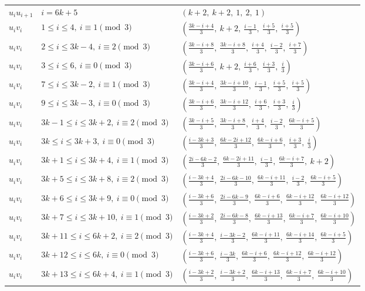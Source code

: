 \begin{longtable}{lll}
$u_i u_{i+1}$ & $i = 6k+5$ & $(k+2,\ k+2,\ 1,\ 2,\ 1)$ \\
$u_i v_i$ & $1 \le i \le 4,\ i \equiv 1 \pmod{3}$ & $(\frac{3k-i+4}{3},\ k+2,\ \frac{i-1}{3},\ \frac{i+5}{3},\ \frac{i+5}{3})$ \\
$u_i v_i$ & $2 \le i \le 3k-4,\ i \equiv 2 \pmod{3}$ & $(\frac{3k-i+8}{3},\ \frac{3k-i+8}{3},\ \frac{i+4}{3},\ \frac{i-2}{3},\ \frac{i+7}{3})$ \\
$u_i v_i$ & $3 \le i \le 6,\ i \equiv 0 \pmod{3}$ & $(\frac{3k-i+6}{3},\ k+2,\ \frac{i+6}{3},\ \frac{i+3}{3},\ \frac{i}{3})$ \\
$u_i v_i$ & $7 \le i \le 3k-2,\ i \equiv 1 \pmod{3}$ & $(\frac{3k-i+4}{3},\ \frac{3k-i+10}{3},\ \frac{i-1}{3},\ \frac{i+5}{3},\ \frac{i+5}{3})$ \\
$u_i v_i$ & $9 \le i \le 3k-3,\ i \equiv 0 \pmod{3}$ & $(\frac{3k-i+6}{3},\ \frac{3k-i+12}{3},\ \frac{i+6}{3},\ \frac{i+3}{3},\ \frac{i}{3})$ \\
$u_i v_i$ & $3k-1 \le i \le 3k+2,\ i \equiv 2 \pmod{3}$ & $(\frac{3k-i+5}{3},\ \frac{3k-i+8}{3},\ \frac{i+4}{3},\ \frac{i-2}{3},\ \frac{6k-i+5}{3})$ \\
$u_i v_i$ & $3k \le i \le 3k+3,\ i \equiv 0 \pmod{3}$ & $(\frac{i-3k+3}{3},\ \frac{6k-2i+12}{3},\ \frac{6k-i+6}{3},\ \frac{i+3}{3},\ \frac{i}{3})$ \\
$u_i v_i$ & $3k+1 \le i \le 3k+4,\ i \equiv 1 \pmod{3}$ & $(\frac{2i-6k-2}{3},\ \frac{6k-2i+11}{3},\ \frac{i-1}{3},\ \frac{6k-i+7}{3},\ k+2)$ \\
$u_i v_i$ & $3k+5 \le i \le 3k+8,\ i \equiv 2 \pmod{3}$ & $(\frac{i-3k+4}{3},\ \frac{2i-6k-10}{3},\ \frac{6k-i+11}{3},\ \frac{i-2}{3},\ \frac{6k-i+5}{3})$ \\
$u_i v_i$ & $3k+6 \le i \le 3k+9,\ i \equiv 0 \pmod{3}$ & $(\frac{i-3k+6}{3},\ \frac{2i-6k-9}{3},\ \frac{6k-i+6}{3},\ \frac{6k-i+12}{3},\ \frac{6k-i+12}{3})$ \\
$u_i v_i$ & $3k+7 \le i \le 3k+10,\ i \equiv 1 \pmod{3}$ & $(\frac{i-3k+2}{3},\ \frac{2i-6k-8}{3},\ \frac{6k-i+13}{3},\ \frac{6k-i+7}{3},\ \frac{6k-i+10}{3})$ \\
$u_i v_i$ & $3k+11 \le i \le 6k+2,\ i \equiv 2 \pmod{3}$ & $(\frac{i-3k+4}{3},\ \frac{i-3k-2}{3},\ \frac{6k-i+11}{3},\ \frac{6k-i+14}{3},\ \frac{6k-i+5}{3})$ \\
$u_i v_i$ & $3k+12 \le i \le 6k,\ i \equiv 0 \pmod{3}$ & $(\frac{i-3k+6}{3},\ \frac{i-3k}{3},\ \frac{6k-i+6}{3},\ \frac{6k-i+12}{3},\ \frac{6k-i+12}{3})$ \\
$u_i v_i$ & $3k+13 \le i \le 6k+4,\ i \equiv 1 \pmod{3}$ & $(\frac{i-3k+2}{3},\ \frac{i-3k+2}{3},\ \frac{6k-i+13}{3},\ \frac{6k-i+7}{3},\ \frac{6k-i+10}{3})$ \\

\end{longtable}
